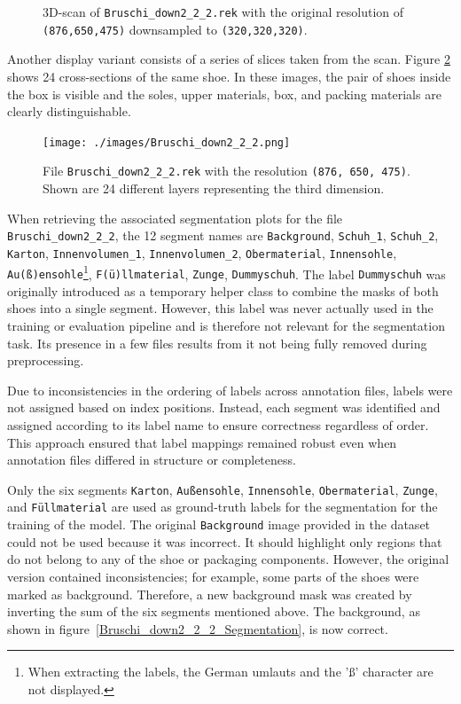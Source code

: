 \begin{figure}[H]
\begin{minipage}{.5\textwidth}
	\end{minipage}
	\caption[3D-scan of {\tt Bruschi\_down2\_2\_2.rek}]{3D-scan of {\tt Bruschi\_down2\_2\_2.rek} with the original resolution of {\tt (876,650,475)} downsampled to {\tt (320,320,320)}.}
	\label{Bruschi_down2_2_2_3d}
\end{figure}

Another display variant consists of a series of slices taken from the scan. Figure \ref{Bruschi_down2_2_2} shows 24 cross-sections of the same shoe. In these images, the pair of shoes inside the box is visible and the soles, upper materials, box, and packing materials are clearly distinguishable.
\begin{figure}[H]
	\centering
	\texttt{[image: ./images/Bruschi\_down2\_2\_2.png]}
	\caption[File {\tt Bruschi\_down2\_2\_2.rek} with the resolution {\tt (876, 650, 475)}]{File {\tt Bruschi\_down2\_2\_2.rek} with the resolution {\tt (876, 650, 475)}. Shown are 24 different layers representing the third dimension.}
	\label{Bruschi_down2_2_2}
\end{figure}

When retrieving the associated segmentation plots for the file {\tt Bruschi\_down2\_2\_2}, the 12 segment names are {\tt Background}, {\tt Schuh\_1}, {\tt Schuh\_2}, {\tt Karton}, {\tt Innenvolumen\_1}, {\tt Innenvolumen\_2}, {\tt Ober\-material}, {\tt Innensohle}, {\tt Au(ß)ensohle}\footnote{When extracting the labels, the German umlauts and the 'ß' character are not displayed.}, {\tt F(ü)llmaterial}, {\tt Zunge}, {\tt Dummyschuh}. The label {\tt Dummyschuh} was originally introduced as a temporary helper class to combine the masks of both shoes into a single segment. However, this label was never actually used in the training or evaluation pipeline and is therefore not relevant for the segmentation task. Its presence in a few files results from it not being fully removed during preprocessing.

\medskip

Due to inconsistencies in the ordering of labels across annotation files, labels were not assigned based on index positions. Instead, each segment was identified and assigned according to its label name to ensure correctness regardless of order. This approach ensured that label mappings remained robust even when annotation files differed in structure or completeness.

\medskip

Only the six segments {\tt Karton}, {\tt Außensohle}, {\tt Innensohle}, {\tt Obermaterial}, {\tt Zunge}, and {\tt Füllmaterial} are used as ground-truth labels for the segmentation for the training of the model. The original {\tt Background} image provided in the dataset could not be used because it was incorrect. It should highlight only regions that do not belong to any of the shoe or packaging components. However, the original version contained inconsistencies; for example, some parts of the shoes were marked as background. Therefore, a new background mask was created by inverting the sum of the six segments mentioned above. The background, as shown in figure~\ref{Bruschi_down2_2_2_Segmentation}, is now correct.

